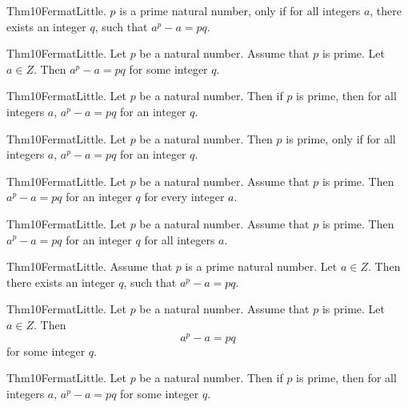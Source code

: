 \documentclass{article}
\begin{document}
Thm10FermatLittle. $p$ is a prime natural number, only if for all integers $a$, there exists an integer $q$, such that $a ^ {p}- a = p q$.

Thm10FermatLittle. Let $p$ be a natural number. Assume that $p$ is prime. Let $a \in Z$. Then $a ^ {p}- a = p q$ for some integer $q$.

Thm10FermatLittle. Let $p$ be a natural number. Then if $p$ is prime, then for all integers $a$, $a ^ {p}- a = p q$ for an integer $q$.

Thm10FermatLittle. Let $p$ be a natural number. Then $p$ is prime, only if for all integers $a$, $a ^ {p}- a = p q$ for an integer $q$.

Thm10FermatLittle. Let $p$ be a natural number. Assume that $p$ is prime. Then $a ^ {p}- a = p q$ for an integer $q$ for every integer $a$.

Thm10FermatLittle. Let $p$ be a natural number. Assume that $p$ is prime. Then $a ^ {p}- a = p q$ for an integer $q$ for all integers $a$.

Thm10FermatLittle. Assume that $p$ is a prime natural number. Let $a \in Z$. Then there exists an integer $q$, such that $a ^ {p}- a = p q$.

Thm10FermatLittle. Let $p$ be a natural number. Assume that $p$ is prime. Let $a \in Z$. Then $$a ^ {p}- a = p q$$ for some integer $q$.

Thm10FermatLittle. Let $p$ be a natural number. Then if $p$ is prime, then for all integers $a$, $a ^ {p}- a = p q$ for some integer $q$.
\end{document}
